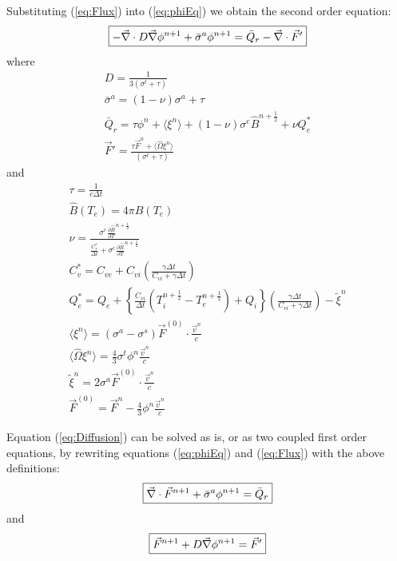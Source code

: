 \documentclass{article}
\newcommand{\dt}{\ensuremath{\Delta t}}
\newcommand{\cviOdt}{\ensuremath{\frac{C_{vi}}{\dt}}}
\newcommand{\Cvs}{\ensuremath{C_{v}^{*}}}
\newcommand{\Bnphlf}{\ensuremath{\hat{B}^{n+\frac{1}{2}}}}
\newcommand{\pBnphlfdT}{\ensuremath{\frac{\partial\hat{B}}{\partial T}^{n+\frac{1}{2}}}}
\begin{document}
Substituting (\ref{eq:Flux}) into (\ref{eq:phiEq}) we obtain
the second order equation:
\begin{equation}
   \boxed{
         - \vec{\nabla} \cdot D \vec{\nabla} \phi^{n+1} +  \bar{\sigma}^{a} \phi^{n+1}
                = \bar{Q}_{r} - \vec{\nabla} \cdot \vec{F}'
         }
\label{eq:Diffusion}
\end{equation}
where
\begin{gather}
        D = \frac{1}{3(\sigma^{t} + \tau) } 
  \label{eq:quant_i}
  \\
        \bar{\sigma}^{a} = (1 - \nu) \sigma^{a} + \tau 
  \\
        \bar{Q}_{r} =\tau \phi^{n}
                + \langle \xi^{n} \rangle
                + (1 - \nu) \sigma^{e} \Bnphlf  + \nu Q_{e}^{*} 
  \\
        \vec{F}' = \frac{\tau \vec{F}^{n}
                        + \langle \hat{\Omega} \xi^{n} \rangle}
               {(\sigma^{t} + \tau)}
\end{gather}
and
\begin{gather}
        \tau = \frac{1}{c\dt}
  \\
        \hat{B}(T_{e}) = 4\pi B(T_{e})
  \\
        \nu = \frac{\sigma^{e} \pBnphlfdT } {\frac{\Cvs}{\dt} + \sigma^{e}\pBnphlfdT}
  \\
        \Cvs = C_{ve} + C_{vi} \left(\frac{\gamma\dt}{C_{vi}+\gamma\dt}\right)
  \\
        Q_{e}^{*} = Q_{e} + \left\{ \cviOdt (T_{i}^{n+\frac{1}{2}} - T_{e}^{n+\frac{1}{2}}) +
                                Q_{i} \right\}
                \left(\frac{\gamma\dt}{C_{vi}+\gamma\dt}\right) -
                \tilde{\xi}^{n}
  \\
        \langle \xi^{n} \rangle =
                        (\sigma^{a} - \sigma^{s}) \vec{F}^{(0)}
                        \cdot \frac{\vec{v}^{n}}{c}
  \\
        \langle \hat{\Omega} \xi^{n} \rangle =
                \frac{4}{3} \sigma^{t} \phi^{n} \frac{\vec{v}^{n}}{c}
  \\
        \tilde{\xi}^{n} = 2 \sigma^{a} \vec{F}^{(0)} \cdot
                                \frac{\vec{v}^{n}}{c}
  \\
        \vec{F}^{(0)} = \vec{F}^{n} - \frac{4}{3} \phi^{n}
                                                \frac{\vec{v}^{n}}{c}
  \label{eq:quant_f}
\end{gather}

Equation (\ref{eq:Diffusion}) can be solved as is,
or as two coupled first order equations,
by rewriting equations (\ref{eq:phiEq}) and (\ref{eq:Flux}) with the above
definitions:
\begin{equation}
   \boxed{
        \vec{\nabla} \cdot \vec{F}^{n+1} + \bar{\sigma}^{a} \phi^{n+1}
                = \bar{Q}_{r}
         }
\label{eq:phi2}
\end{equation}
and
\begin{equation}
   \boxed{
        \vec{F}^{n+1} + D \vec{\nabla} \phi^{n+1} =  \vec{F}'
         }
\label{eq:Flux2}
\end{equation}
\end{document}
